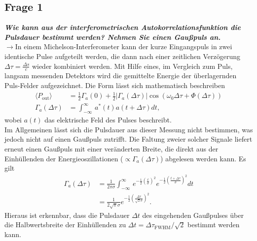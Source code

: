 \subsection{\label{subsec:FZV1}Frage 1}
\textbf{\textit{Wie kann aus der interferometrischen Autokorrelationsfunktion die Pulsdauer 
bestimmt werden? Nehmen Sie einen Gaußpuls an.}}\\
$\rightarrow$In einem Michelson-Interferometer kann der kurze Eingangspuls 
in zwei identische Pulse aufgeteilt werden, die dann nach einer zeitlichen Verzögerung
$\Delta \tau=\frac{\Delta{s}}{c}$ wieder kombiniert werden. Mit Hilfe eines, im Vergleich 
zum Puls, langsam messenden Detektors wird die gemittelte Energie der überlagernden 
Puls-Felder aufgezeichnet. Die Form lässt sich mathematisch beschreiben \cite{UltraFast}
\begin{align}
    \langle P_{\text{out}}\rangle &= \frac{1}{2}\Gamma_{a}(0) + \frac{1}{2}|\Gamma_{a}(\Delta \tau)|\cos(\omega_{0}\Delta\tau + \Phi(\Delta\tau)) \\
    \Gamma_{a}(\Delta \tau) &= \int_{-\infty}^{\infty}\,a^{*}(t)a(t+\Delta \tau) dt,
\end{align}  
wobei $a(t)$ das elektrische Feld des Pulses beschreibt. \\
Im Allgemeinen lässt sich die Pulsdauer aus dieser Messung nicht bestimmen, was jedoch nicht 
auf einen Gaußpuls zutrifft. Die Faltung zweier solcher Signale liefert erneut einen Gaußpuls mit einer
veränderten Breite, die direkt aus der Einhüllenden der Energieoszillationen 
($\propto \Gamma_{a}(\Delta \tau)$) abgelesen werden kann. 
Es gilt 
\begin{align}
    \Gamma_{a}(\Delta \tau) &= \frac{1}{2\pi\sigma}\int_{-\infty}^{\infty}\,e^{-\frac{1}{2}(\frac{t}{\sigma})^{2}}
    e^{-\frac{1}{2}(\frac{t+\Delta \tau}{\sigma})^{2}} dt \\
    &= \frac{1}{2\sqrt{\pi}\sigma}e^{-\frac{1}{2}(\frac{\Delta \tau}{\sqrt{2}\sigma})^{2}}.
\end{align}
Hieraus ist erkennbar, dass die Pulsdauer $\Delta t$ des eingehenden Gaußpulses über die Halbwertsbreite der 
Einhüllenden zu $\Delta t = \Delta \tau_{\text{FWHM}}/\sqrt{2}$ bestimmt werden kann. \\


